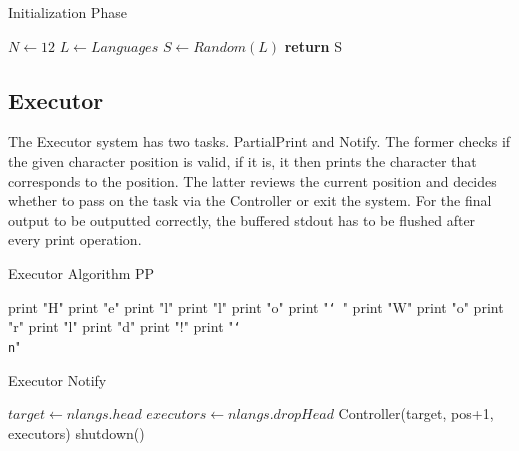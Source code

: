 \documentclass[11pt]{article}
\begin{document}
\begin{algorithm}[H]
\caption{Initialization Phase}
\label{Special Edition}
\begin{algorithmic}[1]
\State $N\gets 12$
\State $L\gets Languages$
	\State $S\gets Random(L)$
\EndFor
\State \textbf{return} S
\EndProcedure
\end{algorithmic}
\end{algorithm}

\subsection{Executor}
The Executor system has two tasks. PartialPrint and Notify. The former checks if the given character position is valid, if it is, it then prints the character that corresponds to the position. The latter reviews the current position and decides whether to pass on the task via the Controller or exit the system.
\newline{}\newline{}
For the final output to be outputted correctly, the buffered stdout has to be flushed after every print operation.
\vfill
\begin{algorithm}[H]
\caption{Executor Algorithm PP}
\label{Special Edition}
\begin{algorithmic}[t]
	\State print "H"
	\State print "e"
	\State print "l" 
	\State print "l"
	\State print "o"
	\State print "\texttt{\char`\ }"
	\State print "W"
	\State print "o"
	\State print "r"
	\State print "l" 
	\State print "d"
	\State print "!"
	\State print "\texttt{\char`\\n}"
\EndIf
\EndProcedure
\end{algorithmic}
\end{algorithm}

\begin{algorithm}[H]
\caption{Executor Notify}
\label{Special Edition}
\begin{algorithmic}[t]
 \State $target\gets nlangs.head$
	\State $executors\gets nlangs.dropHead$	
	\State Controller(target,  pos+1, executors)
\Else
	\State shutdown() 
\EndIf
\EndProcedure
\end{algorithmic}
\end{algorithm}
\raggedbottom
\end{document}
